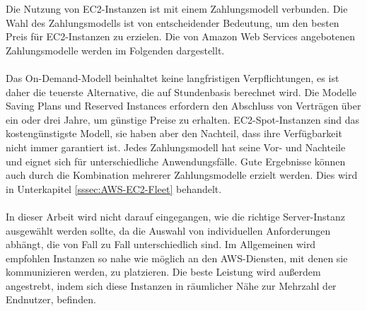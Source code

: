 Die Nutzung von EC2-Instanzen ist mit einem Zahlungsmodell verbunden. Die Wahl des Zahlungsmodells ist von entscheidender Bedeutung, um den besten Preis für EC2-Instanzen zu erzielen.
Die von Amazon Web Services angebotenen Zahlungsmodelle werden im Folgenden dargestellt.
\\\\
Das On-Demand-Modell beinhaltet keine langfristigen Verpflichtungen, es ist daher die teuerste Alternative, die auf Stundenbasis berechnet wird. Die Modelle Saving Plans und Reserved Instances erfordern den Abschluss von Verträgen über ein oder drei Jahre, um günstige Preise zu erhalten. EC2-Spot-Instanzen sind das kostengünstigste Modell, sie haben aber den Nachteil, dass ihre Verfügbarkeit nicht immer garantiert ist. Jedes Zahlungsmodell hat seine Vor- und Nachteile und eignet sich für unterschiedliche Anwendungsfälle. Gute Ergebnisse können auch durch die Kombination mehrerer Zahlungsmodelle erzielt werden. %
Dies wird in Unterkapitel \ref{sssec:AWS-EC2-Fleet} behandelt.
\\\\
In dieser Arbeit wird nicht darauf eingegangen, wie die richtige Server-Instanz ausgewählt werden sollte, da die Auswahl von individuellen Anforderungen abhängt, die von Fall zu Fall unterschiedlich sind. Im Allgemeinen wird empfohlen Instanzen so nahe wie möglich an den AWS-Diensten, mit denen sie kommunizieren werden, zu platzieren. %
Die beste Leistung wird außerdem angestrebt, indem sich diese Instanzen in räumlicher Nähe zur Mehrzahl der Endnutzer, befinden. 
